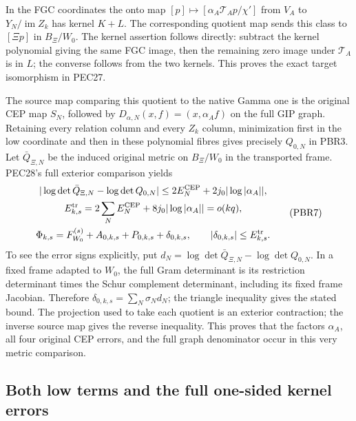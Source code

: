 \documentclass[11pt,a4paper]{article}
\begin{document}
In the FGC coordinates the onto map
$[p]\mapsto[\alpha_A\mathcal T_Ap/\chi']$ from $V_A$ to
$Y_N/\operatorname{im}Z_k$ has kernel $K+L$.
The corresponding quotient map sends this class to $[\Xi p]$ in
$B_\Xi/W_0$. The kernel assertion follows directly: subtract the
kernel polynomial giving the same FGC image, then the remaining
zero image under $\mathcal T_A$ is in $L$; the converse follows
from the two kernels. This proves the exact target isomorphism
in PEC27.

The source map comparing this quotient to the native Gamma one
is the original CEP map $S_N$, followed by
$D_{\alpha,N}(x,f)=(x,\alpha_A f)$ on the full GIP graph.
Retaining every relation column and every $Z_k$ column, minimization
first in the low coordinate and then in these polynomial fibres
gives precisely $Q_{0,N}$ in PBR3. Let $\bar Q_{\Xi,N}$ be the
induced original metric on $B_\Xi/W_0$ in the transported frame.
PEC28's full exterior comparison yields
\[
\begin{gathered}
 |\log\det\bar Q_{\Xi,N}-\log\det Q_{0,N}|
 \le2E_N^{\rm CEP}+2j_0|\log|\alpha_A||,\\
 E_{k,s}^{\rm tr}=2\sum_NE_N^{\rm CEP}
                     +8j_0|\log|\alpha_A||=o(kq),\\
 \Phi_{k,s}=F_{W_0}^{(s)}+A_{0,k,s}+P_{0,k,s}
                      +\delta_{0,k,s},\qquad
 |\delta_{0,k,s}|\le E_{k,s}^{\rm tr}.
\end{gathered}\tag{PBR7}
\]
To see the error signs explicitly, put
$d_N=\log\det\bar Q_{\Xi,N}-\log\det Q_{0,N}$.
In a fixed frame adapted to $W_0$, the full Gram determinant is
its restriction determinant times the Schur complement determinant,
including its fixed frame Jacobian. Therefore
$\delta_{0,k,s}=\sum_N\sigma_Nd_N$; the triangle inequality gives
the stated bound. The projection used to take each quotient is
an exterior contraction; the inverse source map gives the reverse
inequality. This proves that the factors $\alpha_A$, all four
original CEP errors, and the full graph denominator occur in
this very metric comparison.

\subsection{Both low terms and the full one-sided kernel errors}
\end{document}
